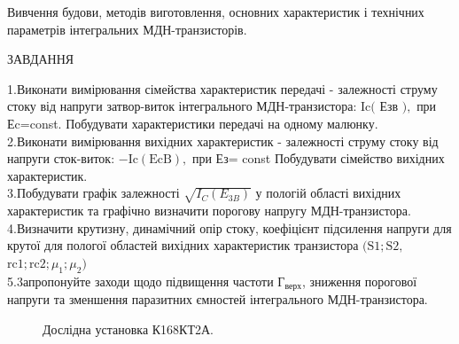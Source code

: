 \documentclass[a4paper,14pt]{extreport}
\begin{document}
Вивчення будови, методів виготовлення, основних характеристик і технічних параметрів інтегральних МДН-транзисторів.

\begin{center} ЗАВДАННЯ\\ \end{center}


1.Виконати вимірювання сімейства характеристик передачі - залежності струму стоку від напруги затвор-виток інтегрального МДН-транзистора: $\mathrm{Ic}($ Езв $),$ при Еc=const. Побудувати характеристики передачі на одному малюнку.\\

2.Виконати вимірювання вихідних характеристик - залежності струму стоку від напруги сток-виток: $-\mathrm{Ic}(\mathrm{EcB}),$ при Ез= const Побудувати сімейство вихідних характеристик.\\

3.Побудувати графік залежності $\sqrt{I_{C}\left(E_{3 B}\right)}$ у пологій області вихідних характеристик та графічно визначити порогову напругу МДН-транзистора.\\

4.Визначити крутизну, динамічний опір стоку, коефіцієнт підсилення напруги для крутої для пологої областей вихідних характеристик транзистора $(\mathrm{S} 1 ; \mathrm{S} 2,$ $ \mathrm{rc} 1 ; \mathrm{rc} 2 ; \mu_{1} ; \mu_{2})$\\

5.3апропонуйте заходи щодо підвищення частоти Г$_{\text{верх}}$, зниження порогової напруги та зменшення паразитних ємностей інтегрального МДН-транзистора.\\

\begin{figure}[h]
\caption{Дослідна установка  К168КТ2А.}
\label{ris1}
\end{figure}
\end{document}
